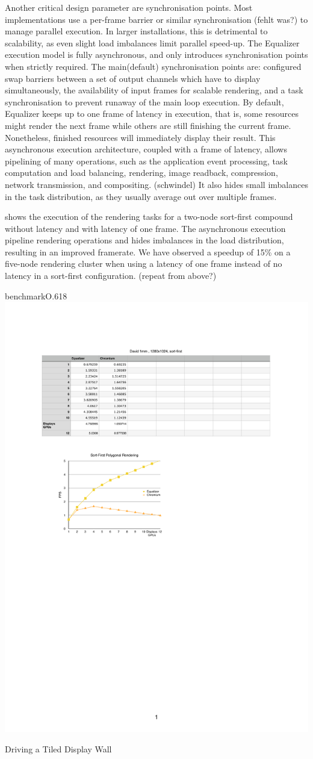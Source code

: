 Another critical design parameter
are synchronisation points. Most implementations use a per-frame barrier or
similar synchronisation (fehlt was?) to manage parallel execution. In larger installations,
this is detrimental to scalability, as even slight load imbalances limit
parallel speed-up. The Equalizer execution model is fully asynchronous, and
only introduces synchronisation points when strictly required. The main(default)
synchronisation points are: configured swap barriers between a set of output
channels which have to display simultaneously, the availability of input frames
for scalable rendering, and a task synchronisation to prevent runaway of the
main loop execution. By default, Equalizer keeps up to one frame of latency in
execution, that is, some resources might render the next frame while others are
still finishing the current frame. Nonetheless, finished resources will
immediately display their result. This asynchronous execution architecture,
coupled with a frame of latency, allows pipelining of many operations, such as
the application event processing, task computation and load balancing,
rendering, image readback, compression, network transmission, and compositing. (schwindel)
It also hides small imbalances in the task distribution, as they usually average
out over multiple frames.

 shows the execution of the rendering tasks for a two-node
sort-first compound without latency and with latency of one frame. The
asynchronous execution pipeline rendering operations and hides imbalances in
the load distribution, resulting in an improved framerate. We have observed a
speedup of 15\% on a five-node rendering cluster when using a latency of one
frame instead of no latency in a sort-first configuration. (repeat from above?)

\begin{wrapfloat}{benchmark}{O}{.618\textwidth}
 \includegraphics[width=.618\textwidth]{results/cr}
 {\caption{\label{rCR}Driving a Tiled Display Wall}}
\end{wrapfloat}

